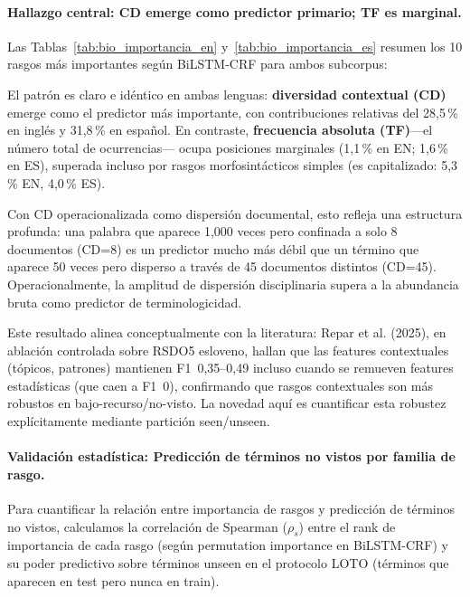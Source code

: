 \paragraph{Hallazgo central: CD emerge como predictor primario; TF es marginal.}
Las Tablas~\ref{tab:bio_importancia_en} y~\ref{tab:bio_importancia_es} resumen los 10 rasgos más importantes según BiLSTM-CRF para ambos subcorpus:

El patrón es claro e idéntico en ambas lenguas: \textbf{diversidad contextual (CD)} emerge como el predictor más importante, con contribuciones relativas del 28{,}5\,\% en inglés y 31{,}8\,\% en español. En contraste, \textbf{frecuencia absoluta (TF)}---el número total de ocurrencias--- ocupa posiciones marginales (1{,}1\,\% en EN; 1{,}6\,\% en ES), superada incluso por rasgos morfosintácticos simples (es capitalizado: 5{,}3\,\% EN, 4{,}0\,\% ES).

Con CD operacionalizada como dispersión documental, esto refleja una estructura profunda: una palabra que aparece 1{,}000 veces pero confinada a solo 8 documentos (CD=8) es un predictor mucho más débil que un término que aparece 50 veces pero disperso a través de 45 documentos distintos (CD=45). Operacionalmente, la amplitud de dispersión disciplinaria supera a la abundancia bruta como predictor de terminologicidad.

Este resultado alinea conceptualmente con la literatura: Repar et al. (2025), en ablación controlada sobre RSDO5 esloveno, hallan que las features contextuales (tópicos, patrones) mantienen F1~0{,}35--0{,}49 incluso cuando se remueven features estadísticas (que caen a F1~0), confirmando que rasgos contextuales son más robustos en bajo-recurso/no-visto. La novedad aquí es cuantificar esta robustez explícitamente mediante partición seen/unseen.

\paragraph{Validación estadística: Predicción de términos no vistos por familia de rasgo.}

Para cuantificar la relación entre importancia de rasgos y predicción de términos no vistos, calculamos la correlación de Spearman ($\rho_s$) entre el rank de importancia de cada rasgo (según permutation importance en BiLSTM-CRF) y su poder predictivo sobre términos unseen en el protocolo LOTO (términos que aparecen en test pero nunca en train).


